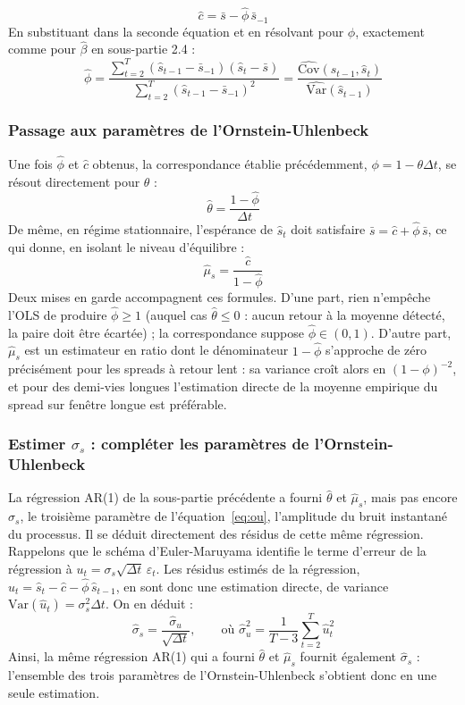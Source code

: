 \documentclass{article}
\begin{document}
\begin{equation}
\hat{c} = \bar{s} - \hat\phi\, \bar{s}_{-1}
\end{equation}
En substituant dans la seconde équation et en résolvant pour $\phi$, exactement comme pour $\hat\beta$ en sous-partie 2.4 :
\begin{equation}
\hat{\phi} = \frac{\displaystyle\sum_{t=2}^{T} (\hat{s}_{t-1} - \bar{s}_{-1})(\hat{s}_t - \bar{s})}{\displaystyle\sum_{t=2}^{T} (\hat{s}_{t-1} - \bar{s}_{-1})^2} = \frac{\widehat{\text{Cov}}(\hat{s}_{t-1}, \hat{s}_t)}{\widehat{\text{Var}}(\hat{s}_{t-1})}
\end{equation}
\subsubsection*{Passage aux paramètres de l'Ornstein-Uhlenbeck}
Une fois $\hat\phi$ et $\hat{c}$ obtenus, la correspondance établie précédemment, $\phi = 1-\theta\Delta t$, se résout directement pour $\theta$ :
\begin{equation}
\hat\theta = \frac{1 - \hat\phi}{\Delta t}
\end{equation}
De même, en régime stationnaire, l'espérance de $\hat{s}_t$ doit satisfaire $\bar{s} = \hat{c} + \hat\phi\,\bar{s}$, ce qui donne, en isolant le niveau d'équilibre :
\begin{equation}
\hat\mu_s = \frac{\hat{c}}{1 - \hat\phi}
\end{equation}
Deux mises en garde accompagnent ces formules. D'une part, rien n'empêche l'OLS de produire $\hat\phi\geq 1$ (auquel cas $\hat\theta\leq 0$ : aucun retour à la moyenne détecté, la paire doit être écartée) ; la correspondance suppose $\hat\phi\in(0,1)$. D'autre part, $\hat\mu_s$ est un estimateur en ratio dont le dénominateur $1-\hat\phi$ s'approche de zéro précisément pour les spreads à retour lent : sa variance croît alors en $(1-\phi)^{-2}$, et pour des demi-vies longues l'estimation directe de la moyenne empirique du spread sur fenêtre longue est préférable.
\subsubsection*{Estimer $\sigma_s$ : compléter les paramètres de l'Ornstein-Uhlenbeck}
La régression AR(1) de la sous-partie précédente a fourni $\hat\theta$ et $\hat\mu_s$, mais pas encore $\sigma_s$, le troisième paramètre de l'équation~\eqref{eq:ou}, l'amplitude du bruit instantané du processus. Il se déduit directement des résidus de cette même régression.
Rappelons que le schéma d'Euler-Maruyama identifie le terme d'erreur de la régression à $u_t = \sigma_s \sqrt{\Delta t}\,\varepsilon_t$. Les résidus estimés de la régression, $\hat{u}_t = \hat{s}_t - \hat{c} - \hat\phi\,\hat{s}_{t-1}$, en sont donc une estimation directe, de variance $\text{Var}(\hat{u}_t) = \sigma_s^2 \Delta t$. On en déduit :
\begin{equation}
\hat\sigma_s = \frac{\hat\sigma_u}{\sqrt{\Delta t}}, \qquad \text{où } \hat\sigma_u^2 = \frac{1}{T-3}\sum_{t=2}^{T} \hat{u}_t^2
\end{equation}
 Ainsi, la même régression AR(1) qui a fourni $\hat\theta$ et $\hat\mu_s$ fournit également $\hat\sigma_s$ : l'ensemble des trois paramètres de l'Ornstein-Uhlenbeck s'obtient donc en une seule estimation.
\end{document}
